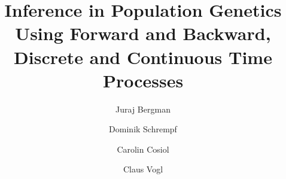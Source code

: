 \documentclass[preprint]{elsarticle}
\begin{document}
\begin{frontmatter}

\title{Inference in Population Genetics Using Forward and Backward, Discrete and Continuous Time Processes}

\author[address1,address2]{Juraj Bergman}
\author[address1,address2]{Dominik Schrempf}
\author[address1]{Carolin Cosiol}
\author[address3]{Claus Vogl}

\address[address1]{Institute of Population Genetics, Vetmeduni Vienna, Veterin\"arplatz 1, A-1210 Wien, Austria}
\address[address2]{Vienna Graduate School of Population Genetics, A-1210 Wien, Austria}
\address[address3]{Institute of Animal Breeding and Genetics, Veterin\"armedizinische Universit\"at Wien, Veterin\"arplatz 1, A-1210 Wien, Austria}

\begin{abstract}


\end{abstract}
\end{frontmatter}
\end{document}
